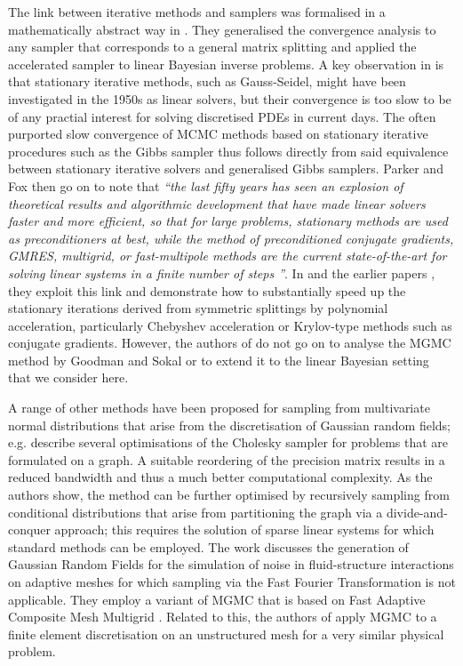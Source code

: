 \documentclass[11pt,english]{article}
\theoremstyle{plain}
\theoremstyle{plain}
\theoremstyle{plain}
\theoremstyle{plain}
\numberwithin{equation}{section}
\newcommand{\jg}[1]{#1}
\begin{document}
\jg{The link between iterative methods and samplers was formalised in a mathematically abstract way in \cite{Fox.C_Parker_2017_AcceleratedGibbsSampling}. They generalised the convergence analysis to any sampler that corresponds to a general matrix splitting and applied the accelerated sampler to linear Bayesian inverse problems.}
A key observation in \cite{Fox.C_Parker_2017_AcceleratedGibbsSampling} is that stationary iterative methods, such as Gauss-Seidel, might have been investigated in the 1950s as linear solvers, but their convergence is too slow to be of any practial interest for solving discretised PDEs in current days. The often purported slow convergence of MCMC methods based on stationary iterative procedures such as the Gibbs sampler thus follows directly from said equivalence between stationary iterative solvers and generalised Gibbs samplers. Parker and Fox then go on to note that \emph{``the last fifty years has seen an explosion of theoretical results and  algorithmic development that have made linear solvers faster and more efficient, so that for large problems, stationary methods are used as preconditioners at best, while the method of preconditioned conjugate gradients, GMRES, multigrid, or fast-multipole methods are the current state-of-the-art for solving linear systems in a finite number of steps \cite{saad2000iterative}''}. In \cite{Fox.C_Parker_2017_AcceleratedGibbsSampling} and the earlier papers \cite{parker2012sampling,fox2014convergence}, they exploit this link and demonstrate how to substantially speed up the stationary iterations derived from symmetric splittings by polynomial acceleration, particularly Chebyshev acceleration or Krylov-type methods such as conjugate gradients. However, the authors of \cite{Fox.C_Parker_2017_AcceleratedGibbsSampling} do not go on to analyse the MGMC method by Goodman and Sokal or to extend it to the linear Bayesian setting that we consider here.

A range of other methods have been proposed for sampling from multivariate normal distributions that arise from the discretisation of Gaussian random fields; e.g. \cite{rue2001fast,rue2005gaussian} describe several optimisations of the Cholesky sampler for problems that are formulated on a graph. A suitable reordering of the precision matrix results in a reduced bandwidth and thus a much better computational complexity. As the authors show, the method can be further optimised by recursively sampling from conditional distributions that arise from partitioning the graph via a divide-and-conquer approach; this requires the solution of sparse linear systems for which standard methods can be employed. 
\jg{The work \cite{Atzberger2010} discusses the generation of Gaussian Random Fields for the simulation of noise in fluid-structure interactions on adaptive meshes for which sampling via the Fast Fourier Transformation is not applicable. They employ a variant of MGMC that is based on Fast Adaptive Composite Mesh Multigrid \cite{mccormick1986fast}. Related to this, the authors of \cite{Plunkett2014} apply MGMC to a finite element discretisation on an unstructured mesh for a very similar physical problem.}
\end{document}
